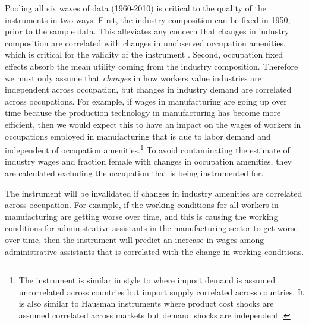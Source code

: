 \documentclass[12pt]{article}
\begin{document}
Pooling all six waves of data (1960-2010) is critical to the quality of the instruments in two ways. First, the industry composition can be fixed in 1950, prior to the sample data. This alleviates any concern that changes in industry composition are correlated with changes in unobserved occupation amenities, which is critical for the validity of the instrument \cite{SorkinBartik}. Second, occupation fixed effects absorb the mean utility coming from the industry composition. Therefore we must only assume that \textit{changes} in how workers value industries are independent across occupation, but changes in industry demand are correlated across occupations. For example, if wages in manufacturing are going up over time because the production technology in manufacturing has become more efficient, then we would expect this to have an impact on the wages of workers in occupations employed in manufacturing that is due to labor demand and independent of occupation amenities.\footnote{The instrument is similar in style to  where import demand is assumed uncorrelated across countries but import supply correlated across countries. It is also similar to Hausman instruments where product cost shocks are assumed correlated across markets but demand shocks are independent \cite{Hausman1996a, Nevo2001}.} To avoid contaminating the estimate of industry wages and fraction female with changes in occupation amenities, they are calculated excluding the occupation that is being instrumented for.


The instrument will be invalidated if changes in industry amenities are correlated across occupation. For example, if the working conditions for all workers in manufacturing are getting worse over time, and this is causing the working conditions for administrative assistants in the manufacturing sector to get worse over time, then the instrument will predict an increase in wages among administrative assistants that is correlated with the change in working conditions.
\end{document}
